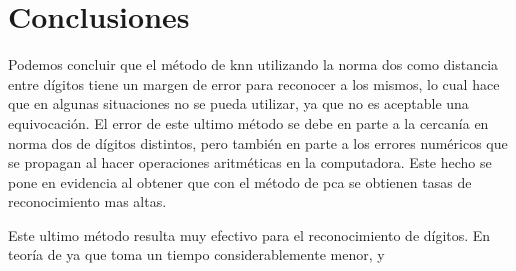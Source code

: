\section{Conclusiones}

Podemos concluir que el método de knn utilizando la norma dos como distancia entre dígitos tiene un margen de error para reconocer a los mismos, lo cual hace que en algunas situaciones no se pueda utilizar, ya que no es aceptable una equivocación. El error de este ultimo método se debe en parte a la cercanía en norma dos de dígitos distintos, pero también en parte a los errores numéricos que se propagan al hacer operaciones aritméticas en la computadora. Este hecho se pone en evidencia al obtener que con el método de pca se obtienen tasas de reconocimiento mas altas. 

Este ultimo método resulta muy efectivo para el reconocimiento de dígitos. En teoría de ya que toma un tiempo considerablemente menor, y 
